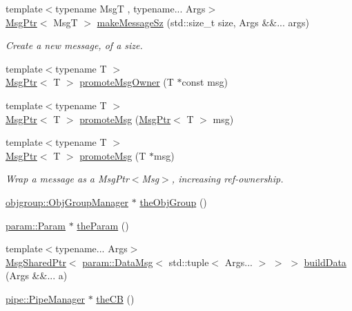 \begin{DoxyCompactItemize}
{\footnotesize template$<$typename MsgT , typename... Args$>$ }\\\hyperlink{namespacevt_a9f5ebd62ee9d6dd8829e3e1cc4f858e9}{Msg\+Ptr}$<$ MsgT $>$ \hyperlink{namespacevt_a02d4a45f1b229ac6fd5da4bf289d6654}{make\+Message\+Sz} (std\+::size\+\_\+t size, Args \&\&... args)
\begin{DoxyCompactList}\small\item\em Create a new message, of a size. \end{DoxyCompactList}\item 
{\footnotesize template$<$typename T $>$ }\\\hyperlink{namespacevt_a9f5ebd62ee9d6dd8829e3e1cc4f858e9}{Msg\+Ptr}$<$ T $>$ \hyperlink{namespacevt_a67418c428a6a98bdc05c264ef8517dd4}{promote\+Msg\+Owner} (T $\ast$const msg)
\item 
{\footnotesize template$<$typename T $>$ }\\\hyperlink{namespacevt_a9f5ebd62ee9d6dd8829e3e1cc4f858e9}{Msg\+Ptr}$<$ T $>$ \hyperlink{namespacevt_af00ebdeb74801e5658cf5726193d5753}{promote\+Msg} (\hyperlink{namespacevt_a9f5ebd62ee9d6dd8829e3e1cc4f858e9}{Msg\+Ptr}$<$ T $>$ msg)
\item 
{\footnotesize template$<$typename T $>$ }\\\hyperlink{namespacevt_a9f5ebd62ee9d6dd8829e3e1cc4f858e9}{Msg\+Ptr}$<$ T $>$ \hyperlink{namespacevt_a991383de8a150393ef67012fbe689dd0}{promote\+Msg} (T $\ast$msg)
\begin{DoxyCompactList}\small\item\em Wrap a message as a Msg\+Ptr$<$\+Msg$>$, increasing ref-\/ownership. \end{DoxyCompactList}\item 
\hyperlink{structvt_1_1objgroup_1_1_obj_group_manager}{objgroup\+::\+Obj\+Group\+Manager} $\ast$ \hyperlink{namespacevt_a833f0115b692f578167cbd88e30d39c5}{the\+Obj\+Group} ()
\item 
\hyperlink{structvt_1_1param_1_1_param}{param\+::\+Param} $\ast$ \hyperlink{namespacevt_a268431014c9031c0f7c33d32c1b8645c}{the\+Param} ()
\item 
{\footnotesize template$<$typename... Args$>$ }\\\hyperlink{namespacevt_ab2b3d506ec8e8d1540aede826d84a239}{Msg\+Shared\+Ptr}$<$ \hyperlink{structvt_1_1param_1_1_data_msg}{param\+::\+Data\+Msg}$<$ std\+::tuple$<$ Args... $>$ $>$ $>$ \hyperlink{namespacevt_a59494f92a4811ae4f2b5264a50aa78dd}{build\+Data} (Args \&\&... a)
\item 
\hyperlink{structvt_1_1pipe_1_1_pipe_manager}{pipe\+::\+Pipe\+Manager} $\ast$ \hyperlink{namespacevt_a673b109e94c7bca58313504c83e1da94}{the\+CB} ()

\end{DoxyCompactItemize}

